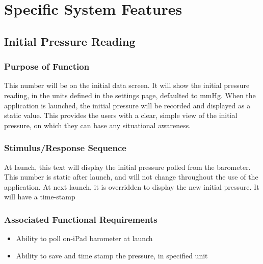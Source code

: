 \documentclass[onecolumn, draftclsnofoot,10pt, compsoc]{IEEEtran}
\begin{document}
\section{Specific System Features}
\subsection{Initial Pressure Reading}

\subsubsection{Purpose of Function}
This number will be on the initial data screen.
It will show the initial pressure reading, in the units defined in the settings page, defaulted to mmHg.
When the application is launched, the initial pressure will be recorded and displayed as a static value.
This provides the users with a clear, simple view of the initial pressure, on which they can base any situational awareness.

\subsubsection{Stimulus/Response Sequence}
At launch, this text will display the initial pressure polled from the barometer.
This number is static after launch, and will not change throughout the use of the application.
At next launch, it is overridden to display the new initial pressure.
It will have a time-stamp

\subsubsection{Associated Functional Requirements}
\begin{itemize}
\item Ability to poll on-iPad barometer at launch
\item Ability to save and time stamp the pressure, in specified unit
\end{itemize}
\end{document}
